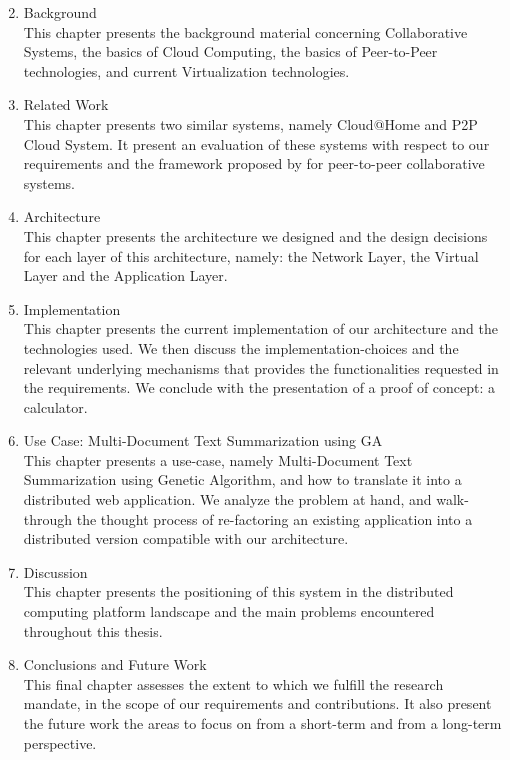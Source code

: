 \documentclass[12pt, titlepage]{uo_temp}
\begin{document}
     \begin{enumerate}[label={\bf Chapter \arabic*},
                       wide=\parindent,
                       leftmargin=\parindent,
                       rightmargin=\parindent]
     \setcounter{enumi}{1}
     \item Background\\
       This chapter presents the background material concerning
       Collaborative Systems, the basics of Cloud Computing, the basics of
       Peer-to-Peer technologies, and current Virtualization technologies.
     \item Related Work\\
       This chapter presents two similar systems, namely Cloud@Home and P2P Cloud
       System. It present an evaluation of these systems with respect to our requirements
       and the framework proposed by \cite{p2p_collab} for peer-to-peer collaborative systems.
     \item Architecture\\
       This chapter presents the architecture we designed and the design decisions for
       each layer of this architecture, namely: the Network Layer, the Virtual Layer and
       the Application Layer.
     \item Implementation\\
       This chapter presents the current implementation of our architecture and the
       technologies used. We then discuss the implementation-choices and the relevant
       underlying mechanisms that provides the functionalities requested in the
       requirements. We conclude with the presentation of a proof of concept: a
       calculator.
     \item Use Case: Multi-Document Text Summarization using GA\\
       This chapter presents a use-case, namely Multi-Document Text Summarization using
       Genetic Algorithm, and how to translate it into a distributed web application. We
       analyze the problem at hand, and walk-through the thought process of re-factoring
       an existing application into a distributed version compatible with our
       architecture.
     \item Discussion\\
       This chapter presents the positioning of this system in the distributed
       computing platform landscape and the main problems encountered throughout this
       thesis.
     \item Conclusions and Future Work\\
       This final chapter assesses the extent to which we fulfill the research mandate, in
       the scope of our requirements and contributions. It also present the future work
       the areas to focus on from a short-term and from a long-term perspective.

     \end{enumerate}
\end{document}
